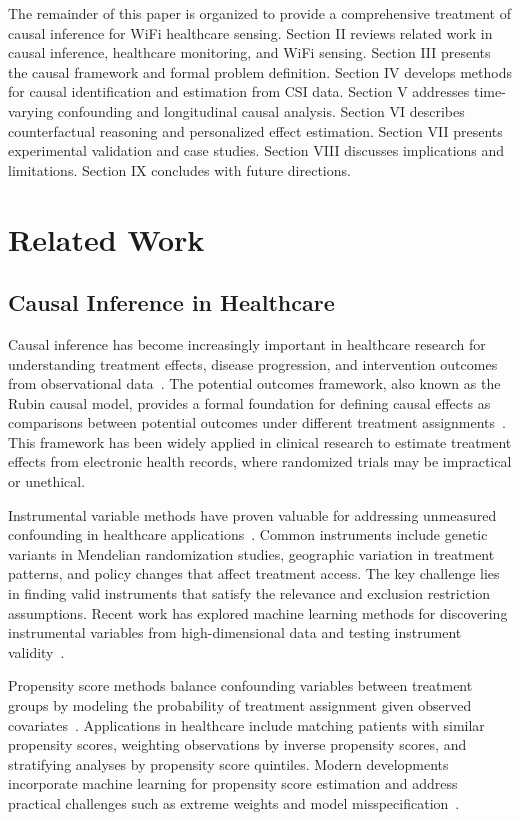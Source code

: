 \documentclass[journal]{IEEEtran}
\begin{document}
The remainder of this paper is organized to provide a comprehensive treatment of causal inference for WiFi healthcare sensing. Section II reviews related work in causal inference, healthcare monitoring, and WiFi sensing. Section III presents the causal framework and formal problem definition. Section IV develops methods for causal identification and estimation from CSI data. Section V addresses time-varying confounding and longitudinal causal analysis. Section VI describes counterfactual reasoning and personalized effect estimation. Section VII presents experimental validation and case studies. Section VIII discusses implications and limitations. Section IX concludes with future directions.

\section{Related Work}

\subsection{Causal Inference in Healthcare}

Causal inference has become increasingly important in healthcare research for understanding treatment effects, disease progression, and intervention outcomes from observational data~\cite{healthcare2022causal}. The potential outcomes framework, also known as the Rubin causal model, provides a formal foundation for defining causal effects as comparisons between potential outcomes under different treatment assignments~\cite{rubin2005causal}. This framework has been widely applied in clinical research to estimate treatment effects from electronic health records, where randomized trials may be impractical or unethical.

Instrumental variable methods have proven valuable for addressing unmeasured confounding in healthcare applications~\cite{iv2021health}. Common instruments include genetic variants in Mendelian randomization studies, geographic variation in treatment patterns, and policy changes that affect treatment access. The key challenge lies in finding valid instruments that satisfy the relevance and exclusion restriction assumptions. Recent work has explored machine learning methods for discovering instrumental variables from high-dimensional data and testing instrument validity~\cite{ml2023iv}.

Propensity score methods balance confounding variables between treatment groups by modeling the probability of treatment assignment given observed covariates~\cite{propensity2020review}. Applications in healthcare include matching patients with similar propensity scores, weighting observations by inverse propensity scores, and stratifying analyses by propensity score quintiles. Modern developments incorporate machine learning for propensity score estimation and address practical challenges such as extreme weights and model misspecification~\cite{ml2022propensity}.
\end{document}
